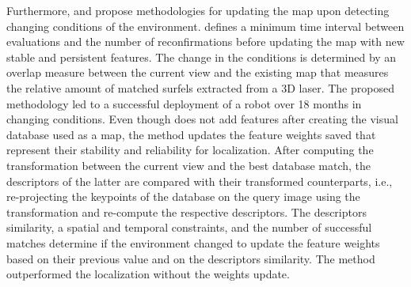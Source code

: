 Furthermore, \cite{egger-et-al:2018:8593854} and \cite{derner-et-al:2021:103676} propose methodologies for updating the map upon detecting changing conditions of the environment.
\cite{egger-et-al:2018:8593854} defines a minimum time interval between evaluations and the number of reconfirmations before updating the map with new stable and persistent features. The change in the conditions is determined by an overlap measure between the current view and the existing map that measures the relative amount of matched surfels extracted from a 3D laser. The proposed methodology led to a successful deployment of a robot over 18 months in changing conditions.
Even though \cite{derner-et-al:2021:103676} does not add features after creating the visual database used as a map, the method updates the feature weights saved that represent their stability and reliability for localization. After computing the transformation between the current view and the best database match, the descriptors of the latter are compared with their transformed counterparts, i.e., re-projecting the keypoints of the database on the query image using the transformation and re-compute the respective descriptors. The descriptors similarity, a spatial and temporal constraints, and the number of successful matches determine if the environment changed to update the feature weights based on their previous value and on the descriptors similarity. The method outperformed the localization without the weights update.

